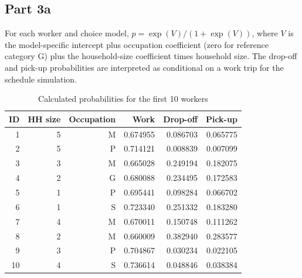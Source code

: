 \documentclass[11pt]{article}
\begin{document}
\subsection{Part 3a}
For each worker and choice model, $p=\exp(V)/(1+\exp(V))$, where $V$ is the model-specific intercept plus occupation coefficient (zero for reference category G) plus the household-size coefficient times household size. The drop-off and pick-up probabilities are interpreted as conditional on a work trip for the schedule simulation.
\begin{table}[H]\centering\small\caption{Calculated probabilities for the first 10 workers}\begin{tabular}{rrrrrr}\toprule
ID & HH size & Occupation & Work & Drop-off & Pick-up\\\midrule
1 & 5 & M & 0.674955 & 0.086703 & 0.065775\\
2 & 5 & P & 0.714121 & 0.008839 & 0.007099\\
3 & 3 & M & 0.665028 & 0.249194 & 0.182075\\
4 & 2 & G & 0.680088 & 0.234495 & 0.172583\\
5 & 1 & P & 0.695441 & 0.098284 & 0.066702\\
6 & 1 & S & 0.723340 & 0.251332 & 0.183280\\
7 & 4 & M & 0.670011 & 0.150748 & 0.111262\\
8 & 2 & M & 0.660009 & 0.382940 & 0.283577\\
9 & 3 & P & 0.704867 & 0.030234 & 0.022105\\
10 & 4 & S & 0.736614 & 0.048846 & 0.038384\\
\bottomrule\end{tabular}\end{table}
\end{document}
